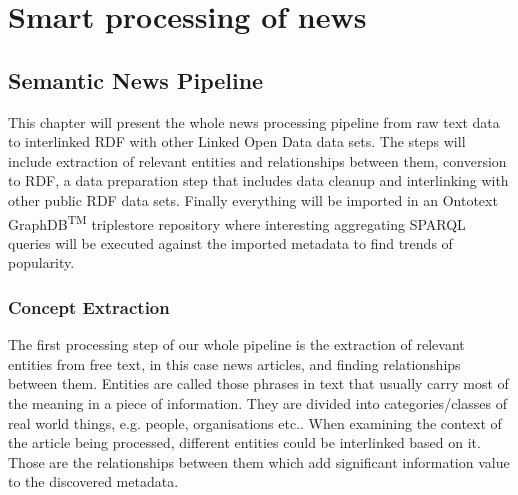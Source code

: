 \chapter{Smart processing of news}
\label{chap:news-pipeline}
\section{Semantic News Pipeline}
This chapter will present the whole news processing pipeline from raw text data to interlinked RDF with other Linked Open Data data sets. The steps will include extraction of relevant entities and relationships between them, conversion to RDF, a data preparation step that includes data cleanup and interlinking with other public RDF data sets. Finally everything will be imported in an Ontotext GraphDB\textsuperscript{TM} triplestore repository where interesting aggregating SPARQL queries will be executed against the imported metadata to find trends of popularity.

\subsection{Concept Extraction}
The first processing step of our whole pipeline is the extraction of relevant entities from free text, in this case news articles, and finding relationships between them. Entities are called those phrases in text that usually carry most of the meaning in a piece of information. They are divided into categories/classes of real world things, e.g. people, organisations etc.. When examining the context of the article being processed, different entities could be interlinked based on it. Those are the relationships between them which add significant information value to the discovered metadata. 

